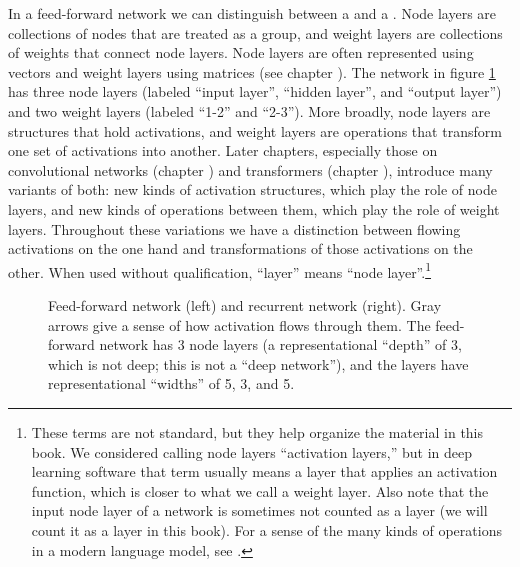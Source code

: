 In a feed-forward network we can distinguish between a  and a . Node layers are collections of nodes that are treated as a group, and weight layers are collections of weights that connect node layers. Node layers are often represented using vectors and weight layers using matrices (see chapter ). The network in figure \ref{nn_types} has three node layers (labeled ``input layer'', ``hidden layer'', and ``output layer'') and two weight layers (labeled ``1-2'' and ``2-3''). More broadly, node layers are structures that hold activations, and weight layers are operations that transform one set of activations into another. Later chapters, especially those on convolutional networks (chapter ) and transformers (chapter ), introduce many variants of both: new kinds of activation structures, which play the role of node layers, and new kinds of operations between them, which play the role of weight layers. Throughout these variations we have a distinction between flowing activations on the one hand and transformations of those activations on the other. When used without qualification, ``layer'' means ``node layer''.\footnote{These terms are not standard, but they help organize the material in this book. We considered calling node layers ``activation layers,'' but in deep learning software that term usually means a layer that applies an activation function, which is closer to what we call a weight layer. Also note that the input node layer of a network is sometimes not counted as a layer (we will count it as a layer in this book). For a sense of the many kinds of operations in a modern language model, see .}

\begin{figure}[h]
\centering
{}
\caption[Simbrain screenshots with additional elements added by Pamela Payne.]{Feed-forward network (left) and recurrent network (right). Gray arrows give a sense of how activation flows through them. The feed-forward network has 3 node layers (a representational ``depth'' of 3, which is not deep; this is not a ``deep network''), and the layers have representational ``widths'' of 5, 3, and 5. }
\label{nn_types}
\end{figure}

